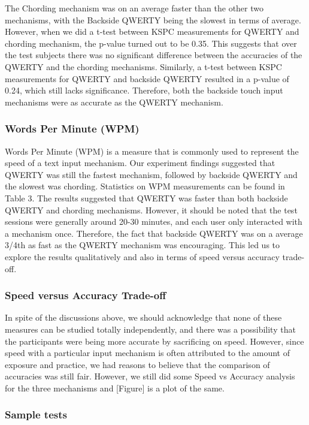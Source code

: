 The Chording mechanism was on an average faster than the other two
mechanisms, with the Backside QWERTY being the slowest in terms of
average. However, when we did a t-test between KSPC measurements for
QWERTY and chording mechanism, the p-value turned out to be 0.35. This
suggests that over the test subjects there was no significant
difference between the accuracies of the QWERTY and the chording
mechanisms. Similarly, a t-test between KSPC measurements for QWERTY
and backside QWERTY resulted in a p-value of 0.24, which still lacks
significance. Therefore, both the backside touch input mechanisms were
as accurate as the QWERTY mechanism.

\subsubsection{Words Per Minute (WPM)}

Words Per Minute (WPM) is a measure that is commonly used to represent
the speed of a text input mechanism. Our experiment findings suggested
that QWERTY was still the fastest mechanism, followed by backside
QWERTY and the slowest was chording. Statistics on WPM measurements
can be found in Table 3.  The results suggested that QWERTY was faster
than both backside QWERTY and chording mechanisms. However, it should
be noted that the test sessions were generally around 20-30 minutes,
and each user only interacted with a mechanism once. Therefore, the
fact that backside QWERTY was on a average 3/4th as fast as the QWERTY
mechanism was encouraging. This led us to explore the results
qualitatively and also in terms of speed versus accuracy trade-off.

\subsubsection{Speed versus Accuracy Trade-off}

In spite of the discussions above, we should acknowledge that none of
these measures can be studied totally independently, and there was a
possibility that the participants were being more accurate by
sacrificing on speed. However, since speed with a particular input
mechanism is often attributed to the amount of exposure and practice,
we had reasons to believe that the comparison of accuracies was still
fair. However, we still did some Speed vs Accuracy analysis for the
three mechanisms and [Figure] is a plot of the same.

\subsubsection{Sample tests}

